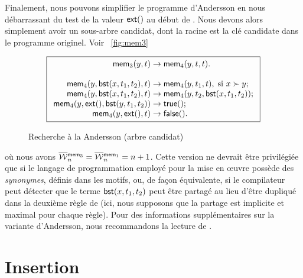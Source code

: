 Finalement, nous pouvons simplifier le programme d'Andersson en nous
débarrassant du test de la valeur \(\textsf{ext}()\) au début de
. Nous devons alors
simplement avoir un sous-arbre candidat, dont la racine est la clé
candidate dans le programme originel. Voir \fig~\vref{fig:mem3}
\begin{figure}
\begin{equation*}
\boxed{
\begin{array}{r@{\;}l@{\;}l}
  \fun{mem}_3(y,t) & \rightarrow & \fun{mem}_4(y,t,t).\\
  \\
  \fun{mem}_4(y,\fun{bst}(x,t_1,t_2),t) & \rightarrow &
  \fun{mem}_4(y,t_1,t),\; \text{si \(x \succ y\)};\\
\fun{mem}_4(y,\fun{bst}(x,t_1,t_2),t) & \rightarrow &
  \fun{mem}_4(y,t_2,\fun{bst}(x,t_1,t_2));\\
\fun{mem}_4(y,\fun{ext}(),\fun{bst}(y,t_1,t_2)) & \rightarrow & \fun{true}();\\
\fun{mem}_4(y,\fun{ext}(),t) & \rightarrow & \fun{false}().
\end{array}}
\end{equation*}
\caption{Recherche à la Andersson (arbre candidat)}
\label{fig:mem3}
\end{figure}
où nous avons \(\OW{\fun{mem}_3}{n} = \OW{\fun{mem}_1}{n} = n + 1\).
Cette version ne devrait être privilégiée que si le langage de
programmation employé pour la mise en œuvre possède des
\emph{synonymes}, définis dans les motifs, ou,
de façon équivalente, si le compilateur peut détecter que le terme
\(\textsf{bst}(x,t_1,t_2)\) peut être partagé au lieu d'être dupliqué
dans la deuxième règle de  (ici, nous supposons que
la partage est implicite et maximal pour chaque
règle). Pour des informations
supplémentaires sur la variante d'Andersson, nous recommandons la
lecture de \cite{Spuler_1992}.


\section{Insertion}
\label{sec:bst_insertion}


